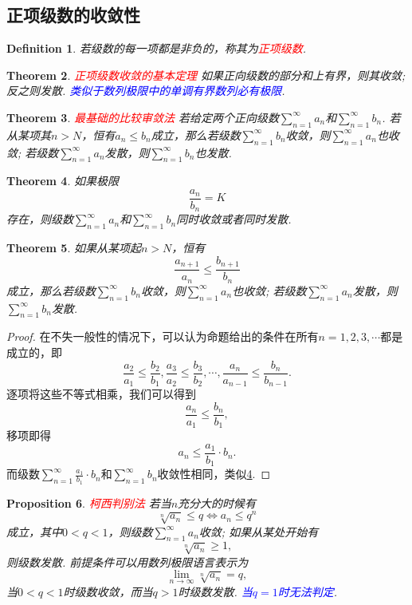 \documentclass{article}
\newtheorem{theorem}{Theorem}[section]
\newtheorem{proposition}[theorem]{Proposition}
\newtheorem{definition}[theorem]{Definition}
\newcommand{\redt}[1]{\textcolor{red}{#1}}
\newcommand{\bluet}[1]{\textcolor{blue}{#1}}
\begin{document}
\subsection{正项级数的收敛性}

\begin{definition}
\rm 若级数的每一项都是非负的，称其为\redt{正项级数}. 
\end{definition}

\begin{theorem}
\rm \redt{正项级数收敛的基本定理} 如果正向级数的部分和上有界，则其收敛; 反之则发散. \bluet{类似于数列极限中的单调有界数列必有极限}.
\end{theorem}


\begin{theorem}
\rm \redt{最基础的比较审敛法}  若给定两个正向级数$\sum\limits_{n=1}^\infty a_n$和$\sum\limits_{n=1}^\infty b_n$. 若从某项其$n > N$，恒有$a_n \leq b_n$成立，那么若级数$\sum\limits_{n=1}^\infty b_n$收敛，则$\sum\limits_{n=1}^\infty a_n$也收敛; 若级数$\sum\limits_{n=1}^\infty a_n$发散，则$\sum\limits_{n=1}^\infty b_n$也发散.
\end{theorem}


\begin{theorem}\label{positive-series: compare-convergence}
\rm 如果极限
$$
\frac{a_n}{b_n} = K
$$
存在，则级数$\sum\limits_{n=1}^\infty a_n$和$\sum\limits_{n=1}^\infty b_n$同时收敛或者同时发散.
\end{theorem}

\begin{theorem}
\rm 如果从某项起$n > N$，恒有
$$
\frac{a_{n+1}}{a_n} \leq \frac{b_{n+1}}{b_n}
$$
成立，那么若级数$\sum\limits_{n=1}^\infty b_n$收敛，则$\sum\limits_{n=1}^\infty a_n$也收敛; 若级数$\sum\limits_{n=1}^\infty a_n$发散，则$\sum\limits_{n=1}^\infty b_n$发散. 
\end{theorem}

\begin{proof}
在不失一般性的情况下，可以认为命题给出的条件在所有$n=1,2,3,\cdots$都是成立的，即
$$
\frac{a_2}{a_1} \leq \frac{b_2}{b_1},\frac{a_3}{a_2} \leq \frac{b_3}{b_2}, \cdots, \frac{a_{n}}{a_{n-1}} \leq \frac{b_{n}}{b_{n-1}}.
$$
逐项将这些不等式相乘，我们可以得到
$$
\frac{a_{n}}{a_1} \leq \frac{b_{n}}{b_1},
$$
移项即得
$$
a_n \leq \frac{a_1}{b_1}\cdot b_n. 
$$
而级数$\sum\limits_{n=1}^\infty \frac{a_1}{b_1}\cdot b_n$和$\sum\limits_{n=1}^\infty b_n$收敛性相同，类似\ref{positive-series: compare-convergence}.
\end{proof}

\begin{proposition}
\rm \redt{柯西判别法} 若当$n$充分大的时候有
$$
\sqrt[n]{a_n} \leq q \Leftrightarrow a_n \leq q^n
$$
成立，其中$0 < q <1$，则级数$\sum\limits_{n=1}^\infty a_n$收敛; 如果从某处开始有
$$
\sqrt[n]{a_n} \geq 1,
$$
则级数发散. 前提条件可以用数列极限语言表示为
$$
\lim\limits_{n \to \infty} \sqrt[n]{a_n} = q,
$$
当$0 < q <1$时级数收敛，而当$q >1$时级数发散. \bluet{当$q=1$时无法判定}. 
\end{proposition}
\end{document}
